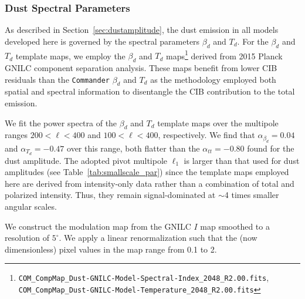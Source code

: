 \documentclass[twocolumn]{aastex631}
\newcommand{\giuse}[1]{\textcolor{orange}{(GP: #1)}}
\begin{document}
\subsubsection{Dust Spectral Parameters}\label{subsec:dust_spec_params}
As described in Section~\ref{sec:dustamplitude}, the dust emission in all models developed here is governed by the spectral parameters $\beta_d$ and $T_d$. For the $\beta_d$ and $T_d$ template maps, we employ the $\beta_d$ and $T_d$ maps\footnote{ \texttt{COM\_CompMap\_Dust-GNILC-Model-Spectral-Index\_2048\_R2.00.fits}, \texttt{COM\_CompMap\_Dust-GNILC-Model-Temperature\_2048\_R2.00.fits}} derived from 2015 Planck GNILC component separation analysis. These maps benefit from lower CIB residuals than the \texttt{Commander} $\beta_d$ and $T_d$ as the methodology employed both spatial and spectral information to disentangle the CIB contribution to the total emission.

We fit the power spectra of the $\beta_d$ and $T_d$ template maps over the multipole ranges $200 < \ell < 400$ and $100 < \ell < 400$, respectively. We find that $\alpha_{\beta_d}= 0.04$ and $\alpha_{T_d} = -0.47$ over this range, both flatter than the $\alpha_{tt} = -0.80$ found for the dust amplitude. The adopted pivot multipole $\ell_1$ is larger than that used for dust amplitudes (see Table~\ref{tab:smallscale_par}) since the template maps employed here are derived from intensity-only data rather than a combination of total and polarized intensity. Thus, they remain signal-dominated at $\sim$4 times smaller angular scales.

We construct the modulation map from the GNILC $I$ map smoothed to a resolution of $5^\circ$. We apply a linear renormalization such that the (now dimensionless) pixel values in the map range from 0.1 to 2. %

\end{document}
